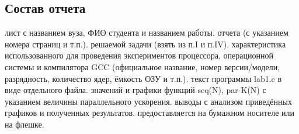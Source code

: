 { %
	\subsection{Состав отчета}
	\begin{enumerate}
		 лист с названием вуза, ФИО студента и названием работы.
		 отчета (с указанием номера страниц и т.п.).
		 решаемой задачи (взять из п.I и п.IV).
		 характеристика использованного для проведения экспериментов процессора, операционной системы и компилятора GCC (официальное название, номер версии/модели, разрядность, количество ядер, ёмкость ОЗУ и т.п.).
		 текст программы lab1.c в виде отдельного файла.
		 значений и графики функций seq(N), par-K(N) с указанием величины параллельного ускорения.
		 выводы с анализом приведённых графиков и полученных результатов.
		 предоставляется на бумажном носителе или на флешке.
	\end{enumerate}
}